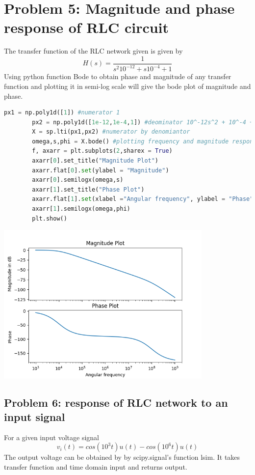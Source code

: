 \documentclass[a4paper]{article}
\begin{document}
\section{Problem 5: Magnitude and phase response of RLC circuit }
The transfer function of the RLC network given is given by
$$ H(s)  = \frac{1}{s^{2}10^{-12} + s10^{-4} + 1}$$ 
Using python function Bode to obtain phase and magnitude of any transfer function and plotting it in semi-log scale will give the bode plot of magnitude and phase.
\begin{lstlisting}[language=Python]
px1 = np.poly1d([1]) #numerator 1
		px2 = np.poly1d([1e-12,1e-4,1]) #deominator 10^-12s^2 + 10^-4 +1 
		X = sp.lti(px1,px2) #numerator by denomiantor
		omega,s,phi = X.bode() #plotting frequency and magnitude response
		f, axarr = plt.subplots(2,sharex = True)
		axarr[0].set_title("Magnitude Plot")
		axarr.flat[0].set(ylabel = "Magnitude")
		axarr[0].semilogx(omega,s)
		axarr[1].set_title("Phase Plot")
		axarr.flat[1].set(xlabel ="Angular frequency", ylabel = "Phase")
		axarr[1].semilogx(omega,phi)
		plt.show()
\end{lstlisting}
\begin{center}

\includegraphics[width=0.8\textwidth]{Figure_5.png}
\end{center}
\subsection{Problem 6: response of RLC network to an input signal }
For a given input voltage signal 
$$ v_{i}(t) = cos(10^{3}t)u(t) - cos(10^{6}t)u(t) $$
The output voltage can be obtained by by scipy.signal's function lsim. It takes transfer function and time domain input and returns output.
\end{document}
